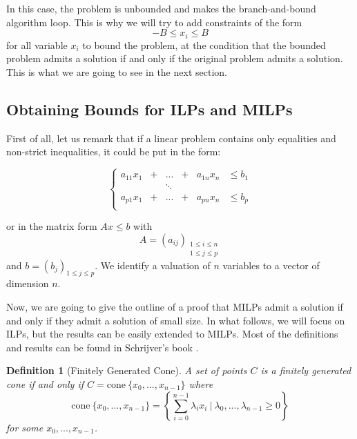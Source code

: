 \documentclass{article}
\newcommand{\cone}{\mathrm{cone}}
\newcommand{\ifff}{if and only if}
\newtheorem{definition}{Definition}
\begin{document}
In this case, the problem is unbounded and makes the branch-and-bound algorithm
loop. This is why we will try to add constraints of the form
$$-B \leqslant x_i \leqslant B$$
for all variable $x_i$ to bound the problem, at the condition that
the bounded problem admits a solution if and only if the original problem admits
a solution. This is what we are going to see in the next section.

\subsection{Obtaining Bounds for ILPs and MILPs}
\label{schrijverbnd}
First of all, let us remark that if a linear problem contains only equalities and 
non-strict inequalities, 
it could be put in the form:

\begin{displaymath}
  \left\{
  \begin{array}{cccccl}
    a_{11} x_1 & + & ...    & + & a_{1n} x_n & \leqslant b_1 \\
               &   & \ddots &   &            &               \\
    a_{p1} x_1 & + & ...    & + & a_{pn} x_n & \leqslant b_p \\
  \end{array}
  \right.
\end{displaymath}

or in the matrix form $Ax \leqslant b$ with
$$A = (a_{ij})_{\substack{1 \leqslant i \leqslant n \\
                          1 \leqslant j \leqslant p}}$$ and
$b = (b_j)_{1 \leqslant j \leqslant p}$. We identify a valuation of $n$
variables to a vector of dimension $n$.

Now, we are going to give the outline of a proof that MILPs admit a solution
if and only if they admit a solution of small size. In what follows, we will
focus on ILPs, but the results can be easily extended to MILPs. Most of the
definitions and results can be found in Schrijver's book
\cite[Sections 7 and 16]{Schrijver1998}.

\begin{definition}[Finitely Generated Cone]
  A set of points $C$ is a \textup{finitely generated cone}
  \ifff{} $C = \cone~\{x_0, ..., x_{n-1}\}$ where
  $$\cone~\{x_0, ..., x_{n-1}\} =
      \left\{\sum_{i=0}^{n-1} \lambda_i x_i~|~
               \lambda_0, ..., \lambda_{n-1} \geqslant 0\right\}
  $$
  for some $x_0, ..., x_{n-1}$.
\end{definition}
\end{document}
